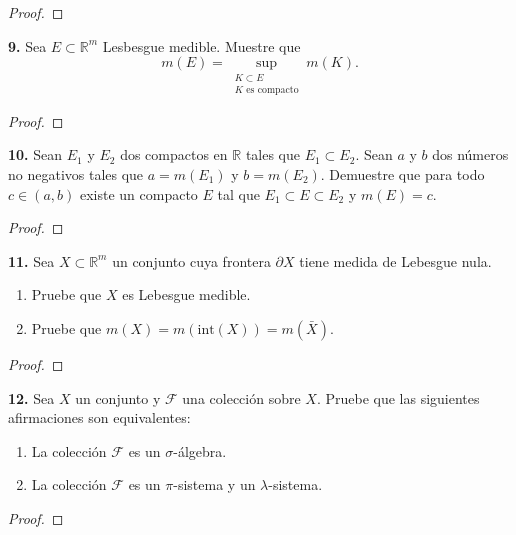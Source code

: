\documentclass{article}
\newenvironment{statement}[1]{\smallskip\noindent\color[rgb]{1.00,0.00,0.50} {\bf #1.}}{}
\theoremstyle{definition}
\theoremstyle{remark}
\newcommand{\BR}{\mathbb R}
\begin{document}
\begin{proof}
\end{proof}

\begin{statement}{9}
  Sea $E \subset \BR^m$ Lesbesgue medible. Muestre que
  \[
    m(E) = \sup_{\substack{K \subset E \\ K \text{ es compacto}}}  m(K).
  \]
\end{statement}

\begin{proof}
\end{proof}

\begin{statement}{10}
  Sean $E_1$ y $E_2$ dos compactos en $\BR$ tales que $E_1 \subset E_2$.
  Sean $a$ y $b$ dos n\'umeros no negativos tales que
  $a = m(E_1)$ y $b = m(E_2)$. Demuestre que para todo $c \in (a, b)$ existe
  un compacto $E$ tal que $E_1 \subset E \subset E_2$ y $m(E) = c$.
\end{statement}

\begin{proof}
\end{proof}

\begin{statement}{11}
  Sea $X \subset \BR^m$ un conjunto cuya frontera $\partial X$ tiene
  medida de Lebesgue nula.
  \begin{enumerate}
    \item Pruebe que $X$ es Lebesgue medible.
    \item Pruebe que $m(X) = m(\text{int}(X)) = m(\bar{X})$.
  \end{enumerate}
\end{statement}

\begin{proof}
\end{proof}

\begin{statement}{12}
  Sea $X$ un conjunto y $\mathcal{F}$ una colecci\'on sobre $X$.
  Pruebe que las siguientes afirmaciones son equivalentes:
  \begin{enumerate}
    \item La colecci\'on $\mathcal{F}$ es un $\sigma$-\'algebra.
    \item La colecci\'on $\mathcal{F}$ es un $\pi$-sistema y un $\lambda$-sistema.
  \end{enumerate}
\end{statement}

\begin{proof}
\end{proof}
\end{document}
